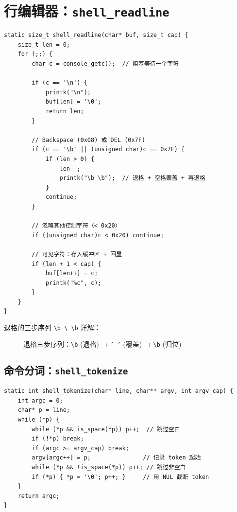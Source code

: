 \section{行编辑器：\texttt{shell\_readline}}

\begin{lstlisting}[style=cstyle]
static size_t shell_readline(char* buf, size_t cap) {
    size_t len = 0;
    for (;;) {
        char c = console_getc();  // 阻塞等待一个字符

        if (c == '\n') {
            printk("\n");
            buf[len] = '\0';
            return len;
        }

        // Backspace (0x08) 或 DEL (0x7F)
        if (c == '\b' || (unsigned char)c == 0x7F) {
            if (len > 0) {
                len--;
                printk("\b \b");  // 退格 + 空格覆盖 + 再退格
            }
            continue;
        }

        // 忽略其他控制字符（< 0x20）
        if ((unsigned char)c < 0x20) continue;

        // 可见字符：存入缓冲区 + 回显
        if (len + 1 < cap) {
            buf[len++] = c;
            printk("%c", c);
        }
    }
}
\end{lstlisting}

退格的三步序列 \texttt{\textbackslash b \textbackslash{} \textbackslash b} 详解：

\begin{figure}[H]
  \centering
  
  \caption{退格三步序列：\texttt{\textbackslash b} (退格) → \texttt{' '} (覆盖) → \texttt{\textbackslash b} (归位)}
\end{figure}

\subsection{命令分词：\texttt{shell\_tokenize}}

\begin{lstlisting}[style=cstyle]
static int shell_tokenize(char* line, char** argv, int argv_cap) {
    int argc = 0;
    char* p = line;
    while (*p) {
        while (*p && is_space(*p)) p++;  // 跳过空白
        if (!*p) break;
        if (argc >= argv_cap) break;
        argv[argc++] = p;               // 记录 token 起始
        while (*p && !is_space(*p)) p++; // 跳过非空白
        if (*p) { *p = '\0'; p++; }     // 用 NUL 截断 token
    }
    return argc;
}
\end{lstlisting}

